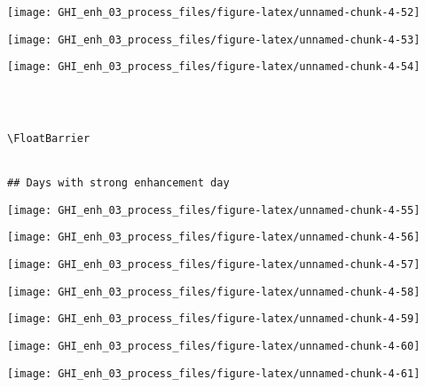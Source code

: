 \documentclass[
  10pt,
  a4paper,oneside]{article}
\begin{document}
\begin{center}\texttt{[image: GHI\_enh\_03\_process\_files/figure-latex/unnamed-chunk-4-52]} \end{center}

\begin{center}\texttt{[image: GHI\_enh\_03\_process\_files/figure-latex/unnamed-chunk-4-53]} \end{center}

\begin{center}\texttt{[image: GHI\_enh\_03\_process\_files/figure-latex/unnamed-chunk-4-54]} \end{center}

\begin{verbatim}
 
 

\FloatBarrier


## Days with strong enhancement day 
\end{verbatim}

\begin{center}\texttt{[image: GHI\_enh\_03\_process\_files/figure-latex/unnamed-chunk-4-55]} \end{center}

\begin{center}\texttt{[image: GHI\_enh\_03\_process\_files/figure-latex/unnamed-chunk-4-56]} \end{center}

\begin{center}\texttt{[image: GHI\_enh\_03\_process\_files/figure-latex/unnamed-chunk-4-57]} \end{center}

\begin{center}\texttt{[image: GHI\_enh\_03\_process\_files/figure-latex/unnamed-chunk-4-58]} \end{center}

\begin{center}\texttt{[image: GHI\_enh\_03\_process\_files/figure-latex/unnamed-chunk-4-59]} \end{center}

\begin{center}\texttt{[image: GHI\_enh\_03\_process\_files/figure-latex/unnamed-chunk-4-60]} \end{center}

\begin{center}\texttt{[image: GHI\_enh\_03\_process\_files/figure-latex/unnamed-chunk-4-61]} \end{center}
\end{document}
